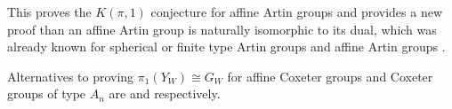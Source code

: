 \documentclass[class=guthesis, crop=false]{standalone}
\begin{document}
This proves the $K(\pi, 1)$ conjecture for affine Artin groups and provides a new proof than an affine Artin group is naturally isomorphic to its dual, which was already known for spherical or finite type Artin groups \cite{bessis_dual_2003} and affine Artin groups \cite{mccammond_sulway_artin_2017}.

Alternatives to \cite{brieskorn_fundamentalgruppe_1971} proving $\pi_1(Y_W) \cong G_W$ for affine Coxeter groups and Coxeter groups of type $A_n$ are \cite{vietdung_fundamental_1983} and \cite{fox_neuwirth_braid_1962} respectively.
\end{document}
